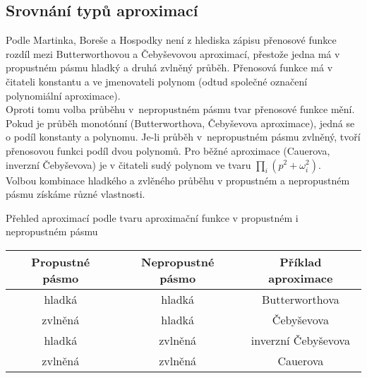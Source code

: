 \subsection{Srovnání typů aproximací}
Podle Martinka, Boreše a Hospodky \cite{12} není z hlediska zápisu přenosové funkce rozdíl mezi Butterworthovou a Čebyševovou aproximací, přestože jedna má v propustném pásmu hladký a druhá zvlněný průběh. Přenosová funkce má v čitateli konstantu a ve jmenovateli polynom (odtud společné označení polynomiální aproximace).\\
Oproti tomu volba průběhu v~nepropustném pásmu tvar přenosové funkce mění. Pokud je průběh monotónní (Butterworthova, Čebyševova aproximace), jedná se o podíl konstanty a polynomu. Je-li průběh v~nepropustném pásmu zvlněný, tvoří přenosovou funkci podíl dvou polynomů. Pro běžné aproximace (Cauerova, inverzní Čebyševova) je v čitateli sudý polynom ve tvaru $\prod _{i} (p^2 + \omega_i^2)$.\\
Volbou kombinace hladkého a zvlěného průběhu v propustném a nepropustném pásmu získáme různé vlastnosti.\\
 \begin{table}[h]
 \caption[Přehled aproximací podle tvaru aproximační funkce v propustném i nepropustném pásmu]{\label{tab:Přehled aproximací podle tvaru aproximační funkce v propustném i nepropustném pásmu}Přehled aproximací podle tvaru aproximační funkce v propustném i nepropustném pásmu \cite{12}}
  \end{table}
\begin{center}
\begin{table}[h]
\centering
  \begin{tabular}{ | c | c | c | }
    \hline
    Propustné pásmo & Nepropustné pásmo & Příklad aproximace \\ \hline
    hladká & hladká & Butterworthova \\ \hline
    zvlněná & hladká & Čebyševova \\ \hline
    hladká & zvlněná & inverzní Čebyševova \\ \hline
    zvlněná & zvlněná & Cauerova \\ \hline
  \end{tabular}
   \end{table}
   \end{center}